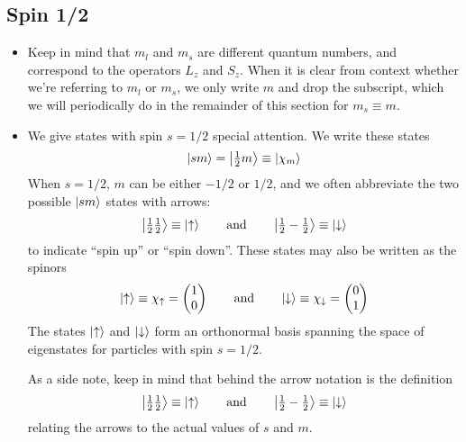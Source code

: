 \documentclass[11pt, a4paper]{article}
\newcommand{\eqtext}[1]{\qquad \text{#1} \qquad}
\newcommand{\ua}{\uparrow}  %
\newcommand{\da}{\downarrow}  %
\begin{document}
\subsection{Spin 1/2}
\begin{itemize}
	\item Keep in mind that $ m_{l} $ and $ m_{s} $ are different quantum numbers, and correspond to the operators $ L_{z} $ and $ S_{z} $. When it is clear from context whether we're referring to $ m_{l} $ or $ m_{s} $, we only write $ m $ and drop the subscript, which we will periodically do in the remainder of this section for $ m_{s} \equiv m $. 
	
	\item We give states with spin $ s = 1/2 $ special attention. We write these states
	\begin{equation*}
		\ket{sm} = \ket{\tfrac{1}{2} m} \equiv \ket{\chi_{m}}
	\end{equation*}
	When $ s = 1/2 $, $ m $ can be either $ -1/2 $ or $ 1/2 $, and we often abbreviate the two possible $ \ket{sm} $  states with arrows:
	\begin{equation*}
		\ket{\tfrac{1}{2}\tfrac{1}{2}} \equiv \ket{\ua} \eqtext{and} \ket{\tfrac{1}{2}-\tfrac{1}{2}} \equiv \ket{\da}
	\end{equation*}
	to indicate ``spin up'' or ``spin down''. These states may also be written as the spinors
	\begin{equation*}
		\ket{\ua}  \equiv \chi_{\ua} = 
		\begin{pmatrix}
			1\\
			0
		\end{pmatrix}
		\eqtext{and}
		\ket{\da}  \equiv \chi_{\da} = 
		\begin{pmatrix}
			0\\
			1
		\end{pmatrix}
	\end{equation*}
	The states $ \ket{\ua} $ and $ \ket{\da} $ form an orthonormal basis spanning the space of eigenstates for particles with spin $ s = 1/2 $.
	
	As a side note, keep in mind that behind the arrow notation is the definition
	\begin{equation*}
		\ket{\tfrac{1}{2}\tfrac{1}{2}} \equiv \ket{\ua} \eqtext{and} \ket{\tfrac{1}{2}-\tfrac{1}{2}} \equiv \ket{\da}
	\end{equation*}
	relating the arrows to the actual values of $ s $ and $ m $.
	

\end{itemize}
\end{document}
